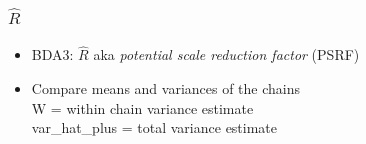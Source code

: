 \documentclass[10pt]{beamer}
\begin{document}
\begin{frame}[fragile]

\frametitle{ $\widehat{R}$}

  \begin{itemize}
  \item BDA3: $\widehat{R}$ aka {\em potential scale reduction factor} (PSRF)
  \item Compare means and variances of the chains\\
    W = within chain variance estimate\\
    var\_hat\_plus = total variance estimate\\
    \vspace{1\baselineskip}
  \end{itemize}

\end{frame}
\end{document}
